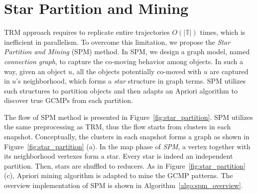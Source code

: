 \section{Star Partition and Mining}
\label{sec:spm_solution}
TRM approach requires to replicate entire
trajectories $O(|\mathbb{T}|)$ times, which is inefficient
in parallelism. To overcome this limitation, we 
propose the \emph{Star Partition and Mining} (SPM) method.
In SPM, we design a graph model, named \emph{connection graph}, to capture 
the co-moving behavior among objects. In such a way, 
given an object $u$, all the objects potentially
co-moved with $u$ are captured in $u$'s neighborhood, which
forms a \emph{star} structure in graph terms. SPM utilizes
such structures to partition objects and then adapts an Apriori 
algorithm to discover true GCMPs from each partition.

The flow of SPM method is presented in Figure~\ref{fig:star_partition}.
SPM utilizes the same preprocessing as TRM, thus the flow starts
from clusters in each snapshot. Conceptually, the clusters 
in each snapshot forms a graph as shown in Figure~\ref{fig:star_partition} (a).
In the map phase of \emph{SPM}, a vertex together with its neighborhood 
vertexes form a star. Every star is indeed an independent partition.
Then, stars are shuffled to reducers. As in
Figure~\ref{fig:star_partition} (c), Apriori mining algorithm is adapted
to mine the GCMP patterns. The overview implementation of SPM is shown 
in Algorithm~\ref{algo:spm_overview}.


